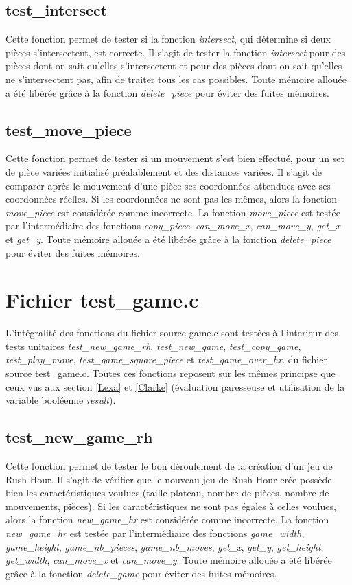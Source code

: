 \documentclass{report}
\begin{document}
\subsection{test\_intersect}
Cette fonction permet de tester si la fonction \emph{intersect}, qui détermine si deux pièces s'intersectent, est correcte. Il s'agit de tester la fonction \emph{intersect} pour des pièces dont on sait qu'elles s'intersectent et pour des pièces dont on sait qu'elles ne s'intersectent pas, afin de traiter tous les cas possibles. Toute mémoire allouée a été libérée grâce à la fonction \emph{delete\_piece} pour éviter des fuites mémoires.
\subsection{test\_move\_piece}
Cette fonction permet de tester si un mouvement s'est bien effectué, pour un set de pièce variées initialisé préalablement et des distances variées. Il s'agit de comparer après le mouvement d'une pièce ses coordonnées attendues avec ses coordonnées réelles. Si les coordonnées ne sont pas les mêmes, alors la fonction \emph{move\_piece} est considérée comme incorrecte. La fonction \emph{move\_piece} est testée par l'intermédiaire des fonctions \emph{copy\_piece}, \emph{can\_move\_x}, \emph{can\_move\_y}, \emph{get\_x} et \emph{get\_y}. Toute mémoire allouée a été libérée grâce à la fonction \emph{delete\_piece} pour éviter des fuites mémoires.

\section{Fichier test\_game.c}
L'intégralité des fonctions du fichier source game.c sont testées à l'interieur des tests unitaires \emph{test\_new\_game\_rh}, \emph{test\_new\_game}, \emph{test\_copy\_game}, \emph{test\_play\_move}, \emph{test\_game\_square\_piece} et \emph{test\_game\_over\_hr}. du fichier source test\_game.c. Toutes ces fonctions reposent sur les mêmes principse que ceux vus aux section \ref{Lexa} et \ref{Clarke} (évaluation paresseuse et utilisation de la variable booléenne \emph{result}).
\subsection{test\_new\_game\_rh}
Cette fonction permet de tester le bon déroulement de la création d'un jeu de Rush Hour. Il s'agit de vérifier que le nouveau jeu de Rush Hour crée possède bien les caractéristiques voulues (taille plateau, nombre de pièces, nombre de mouvements, pièces). Si les caractéristiques ne sont pas égales à celles voulues, alors la fonction \emph{new\_game\_hr} est considérée comme incorrecte. La fonction \emph{new\_game\_hr} est testée par l'intermédiaire des fonctions \emph{game\_width}, \emph{game\_height}, \emph{game\_nb\_pieces}, \emph{game\_nb\_moves}, \emph{get\_x}, \emph{get\_y}, \emph{get\_height}, \emph{get\_width}, \emph{can\_move\_x} et \emph{can\_move\_y}. Toute mémoire allouée a été libérée grâce à la fonction \emph{delete\_game} pour éviter des fuites mémoires.
\end{document}
